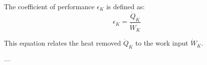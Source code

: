 The coefficient of performance \( \epsilon_K \) is defined as:  
\[
\epsilon_K = \frac{\dot{Q}_K}{\dot{W}_K}
\]  

This equation relates the heat removed \( \dot{Q}_K \) to the work input \( \dot{W}_K \).  

---